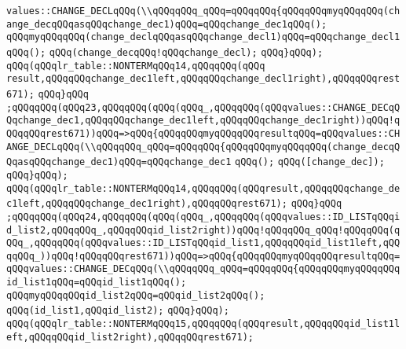 \verb|values::CHANGE_DECLqQQq(\\qQQqqQQq_qQQq=qQQqqQQq{qQQqqQQqmyqQQqqQQq(change_decqQQqasqQQqchange_dec1)qQQq=qQQqchange_dec1qQQq();|\newline
\verb|qQQqmyqQQqqQQq(change_declqQQqasqQQqchange_decl1)qQQq=qQQqchange_decl1qQQq();|\newline
\verb|qQQq(change_decqQQq!qQQqchange_decl);|\newline
\verb|qQQq}qQQq);|\newline
\verb|qQQq(qQQqlr_table::NONTERMqQQq14,qQQqqQQq(qQQq|\newline
\verb|result,qQQqqQQqchange_dec1left,qQQqqQQqchange_decl1right),qQQqqQQqrest671);|\newline
\verb|qQQq}qQQq|\newline
\verb|;qQQqqQQq(qQQq23,qQQqqQQq(qQQq(qQQq_,qQQqqQQq(qQQqvalues::CHANGE_DECqQQqchange_dec1,qQQqqQQqchange_dec1left,qQQqqQQqchange_dec1right))qQQq!qQQqqQQqrest671))qQQq=>qQQq{qQQqqQQqmyqQQqqQQqresultqQQq=qQQqvalues::CHANGE_DECLqQQq(\\qQQqqQQq_qQQq=qQQqqQQq{qQQqqQQqmyqQQqqQQq(change_decqQQqasqQQqchange_dec1)qQQq=qQQqchange_dec1|\newline
\verb|qQQq();|\newline
\verb|qQQq([change_dec]);|\newline
\verb|qQQq}qQQq);|\newline
\verb|qQQq(qQQqlr_table::NONTERMqQQq14,qQQqqQQq(qQQqresult,qQQqqQQqchange_dec1left,qQQqqQQqchange_dec1right),qQQqqQQqrest671);|\newline
\verb|qQQq}qQQq|\newline
\verb|;qQQqqQQq(qQQq24,qQQqqQQq(qQQq(qQQq_,qQQqqQQq(qQQqvalues::ID_LISTqQQqid_list2,qQQqqQQq_,qQQqqQQqid_list2right))qQQq!qQQqqQQq_qQQq!qQQqqQQq(qQQq_,qQQqqQQq(qQQqvalues::ID_LISTqQQqid_list1,qQQqqQQqid_list1left,qQQqqQQq_))qQQq!qQQqqQQqrest671))qQQq=>qQQq{qQQqqQQqmyqQQqqQQqresultqQQq=qQQqvalues::CHANGE_DECqQQq(\\qQQqqQQq_qQQq=qQQqqQQq{qQQqqQQqmyqQQqqQQq|\newline
\verb|id_list1qQQq=qQQqid_list1qQQq();|\newline
\verb|qQQqmyqQQqqQQqid_list2qQQq=qQQqid_list2qQQq();|\newline
\verb|qQQq(id_list1,qQQqid_list2);|\newline
\verb|qQQq}qQQq);|\newline
\verb|qQQq(qQQqlr_table::NONTERMqQQq15,qQQqqQQq(qQQqresult,qQQqqQQqid_list1left,qQQqqQQqid_list2right),qQQqqQQqrest671);|\newline
